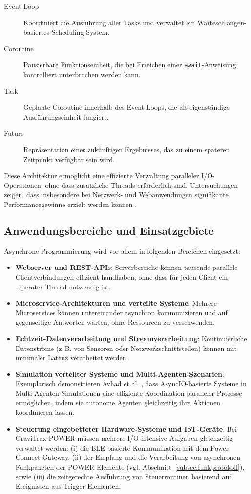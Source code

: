 \begin{description}
\item[Event Loop] Koordiniert die Ausführung aller Tasks und verwaltet ein Warteschlangen-basiertes Scheduling-System.
\item[Coroutine] Pausierbare Funktionseinheit, die bei Erreichen einer \texttt{await}-Anweisung kontrolliert unterbrochen werden kann.
\item[Task] Geplante Coroutine innerhalb des Event Loops, die als eigenständige Ausführungseinheit fungiert.
\item[Future] Repräsentation eines zukünftigen Ergebnisses, das zu einem späteren Zeitpunkt verfügbar sein wird.
\end{description}

Diese Architektur ermöglicht eine effiziente Verwaltung paralleler I/O-Operationen, ohne dass zusätzliche Threads erforderlich sind.
Untersuchungen zeigen, dass insbesondere bei Netzwerk- und Webanwendungen signifikante Performancegewinne erzielt werden können \cite{swindell2022}.

\subsection{Anwendungsbereiche und Einsatzgebiete}

Asynchrone Programmierung wird vor allem in folgenden Bereichen eingesetzt:

\begin{itemize}
\item \textbf{Webserver und REST-APIs}: Serverbereiche können tausende parallele Clientverbindungen effizient handhaben, ohne dass für jeden Client ein seperater Thread notwendig ist.
\item \textbf{Microservice-Architekturen und verteilte Systeme}: Mehrere Microservices können untereinander asynchron kommunizieren und auf gegenseitige Antworten warten, ohne Ressourcen zu verschwenden.
\item \textbf{Echtzeit-Datenverarbeitung und Streamverarbeitung}: Kontinuierliche Datenströme (z.\,B. von Sensoren oder Netzwerkschnittstellen) können mit minimaler Latenz verarbeitet werden.
\item \textbf{Simulation verteilter Systeme und Multi-Agenten-Szenarien}: Exemplarisch demonstrieren Avhad et al. \cite{avhad2024}, dass AsyncIO-basierte Systeme in Multi-Agenten-Simulationen eine effiziente Koordination paralleler Prozesse ermöglichen, indem sie autonome Agenten gleichzeitig ihre Aktionen koordinieren lassen.
\item \textbf{Steuerung eingebetteter Hardware-Systeme und IoT-Geräte}: Bei GraviTrax POWER müssen mehrere I/O-intensive Aufgaben gleichzeitig verwaltet werden: (i) die BLE-basierte Kommunikation mit dem Power Connect-Gateway, (ii) der Empfang und die Verarbeitung von asynchronen Funkpaketen der POWER-Elemente (vgl. Abschnitt~\ref{subsec:funkprotokoll}), sowie (iii) die zeitgerechte Ausführung von Steuerroutinen basierend auf Ereignissen aus Trigger-Elementen.
\end{itemize}

